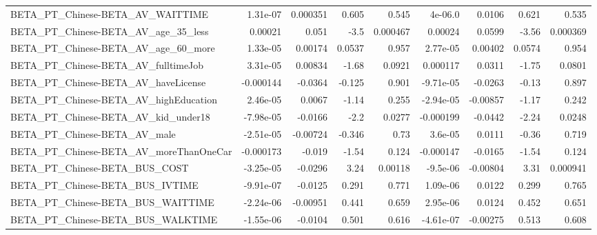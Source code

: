 \begin{tabular}{lrrrrrrrr}
BETA\_PT\_Chinese-BETA\_AV\_WAITTIME                   &    1.31e-07 &     0.000351 &    0.605 &    0.545 &    4e-06.0 &      0.0106 &        0.621 &         0.535 \\
BETA\_PT\_Chinese-BETA\_AV\_age\_35\_less                &     0.00021 &        0.051 &     -3.5 & 0.000467 &    0.00024 &      0.0599 &        -3.56 &      0.000369 \\
BETA\_PT\_Chinese-BETA\_AV\_age\_60\_more                &    1.33e-05 &      0.00174 &   0.0537 &    0.957 &   2.77e-05 &     0.00402 &       0.0574 &         0.954 \\
BETA\_PT\_Chinese-BETA\_AV\_fulltimeJob                &    3.31e-05 &      0.00834 &    -1.68 &   0.0921 &   0.000117 &      0.0311 &        -1.75 &        0.0801 \\
BETA\_PT\_Chinese-BETA\_AV\_haveLicense                &   -0.000144 &      -0.0364 &   -0.125 &    0.901 &  -9.71e-05 &     -0.0263 &        -0.13 &         0.897 \\
BETA\_PT\_Chinese-BETA\_AV\_highEducation              &    2.46e-05 &       0.0067 &    -1.14 &    0.255 &  -2.94e-05 &    -0.00857 &        -1.17 &         0.242 \\
BETA\_PT\_Chinese-BETA\_AV\_kid\_under18                &   -7.98e-05 &      -0.0166 &     -2.2 &   0.0277 &  -0.000199 &     -0.0442 &        -2.24 &        0.0248 \\
BETA\_PT\_Chinese-BETA\_AV\_male                       &   -2.51e-05 &     -0.00724 &   -0.346 &     0.73 &    3.6e-05 &      0.0111 &        -0.36 &         0.719 \\
BETA\_PT\_Chinese-BETA\_AV\_moreThanOneCar             &   -0.000173 &       -0.019 &    -1.54 &    0.124 &  -0.000147 &     -0.0165 &        -1.54 &         0.124 \\
BETA\_PT\_Chinese-BETA\_BUS\_COST                      &   -3.25e-05 &      -0.0296 &     3.24 &  0.00118 &   -9.5e-06 &    -0.00804 &         3.31 &      0.000941 \\
BETA\_PT\_Chinese-BETA\_BUS\_IVTIME                    &   -9.91e-07 &      -0.0125 &    0.291 &    0.771 &   1.09e-06 &      0.0122 &        0.299 &         0.765 \\
BETA\_PT\_Chinese-BETA\_BUS\_WAITTIME                  &   -2.24e-06 &     -0.00951 &    0.441 &    0.659 &   2.95e-06 &      0.0124 &        0.452 &         0.651 \\
BETA\_PT\_Chinese-BETA\_BUS\_WALKTIME                  &   -1.55e-06 &      -0.0104 &    0.501 &    0.616 &  -4.61e-07 &    -0.00275 &        0.513 &         0.608 \\

\end{tabular}
